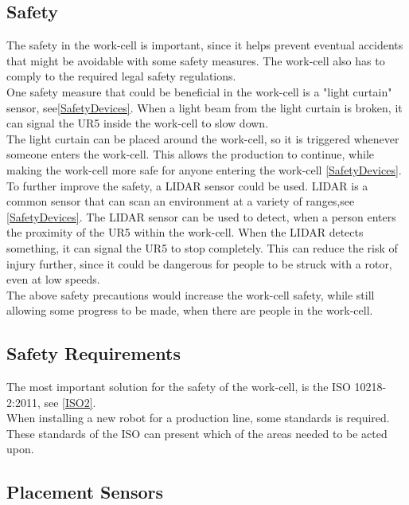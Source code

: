 \subsection{Safety}

The safety in the work-cell is important, since it helps prevent eventual accidents that might be avoidable with some safety measures. The work-cell also has to comply to the required legal safety regulations.\\
One safety measure that could be beneficial in the work-cell is a "light curtain" sensor, see\ref{SafetyDevices}.
When a light beam from the light curtain is broken, it can signal the UR5 inside the work-cell to slow down.\\
The light curtain can be placed around the work-cell, so it is triggered whenever someone enters the work-cell. This allows the production to continue, while making the work-cell more safe for anyone entering the work-cell \ref{SafetyDevices}.\\
To further improve the safety, a LIDAR sensor could be used.
LIDAR is a common sensor that can scan an environment at a variety of ranges,see \ref{SafetyDevices}.
The LIDAR sensor can be used to detect, when a person enters the proximity of the UR5 within the work-cell. When the LIDAR detects something, it can signal the UR5 to stop completely. This can reduce the risk of injury further, since it could be dangerous for people to be struck with a rotor, even at low speeds.\\
The above safety precautions would increase the work-cell safety, while still allowing some progress to be made, when there are people in the work-cell.\\

\subsection{Safety Requirements}

The most important solution for the safety of the work-cell, is the ISO 10218-2:2011, see \ref{ISO2}.\\
When installing a new robot for a production line, some standards is required. These standards of the ISO can present which of the areas needed to be acted upon.\\

\subsection{Placement Sensors}

